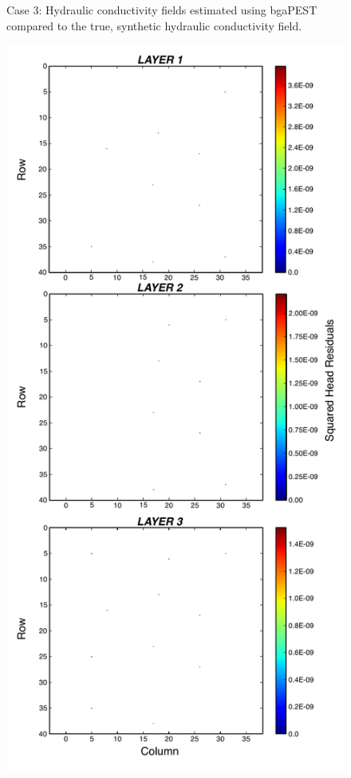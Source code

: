 \documentclass[11pt,oneside,onecolumn]{usgsreport}
\begin{document}
\begin{appendix}
\begin{figure}[H]
\caption{\label{fig:3LK_case3}Case 3: Hydraulic conductivity fields estimated
using bgaPEST compared to the true, synthetic hydraulic conductivity
field.}
\end{figure}


\begin{figure}[H]
\begin{center}\includegraphics[scale=0.5]{figures/3L_resid_case3}\end{center}


\end{figure}
\end{appendix}
\end{document}
